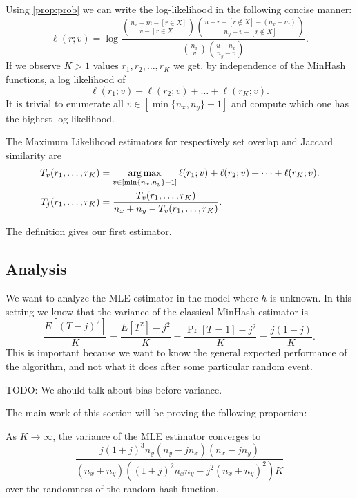 Using \cref{prop:prob} we can write the log-likelihood in the following concise manner:
\[
   \ell(r; v) = \log \frac{\binom{n_x-m-[r\in X]}{v-[r\in X]}\binom{u-r-[r\not\in X]-(n_x-m)}{n_y-v-[r\not\in X]}}{\binom{n_x}{v}\binom{u-n_x}{n_y-v}}.
   \label{eq:log-likelihood}
\]
If we observe $K>1$ values $r_1, r_2, \dots, r_K$ we get, by independence of the MinHash functions, a log likelihood of
\[
   \ell(r_1; v) + \ell(r_2; v) + \dots + \ell(r_K; v).
\]
It is trivial to enumerate all $v\in[\min\{n_x,n_y\}+1]$ and compute which one has the highest log-likelihood.
\begin{definition}
   The Maximum Likelihood estimators for respectively set overlap and Jaccard similarity are
   \begin{align}
      T_v(r_1,\dots,r_K) &= \operatorname*{arg\,max}_{v\in[\min\{n_x,n_y\}+1]} \ell(r_1; v) + \ell(r_2; v) + \dots + \ell(r_K; v).
      \\T_j(r_1,\dots,r_K) &= \frac{T_v(r_1,\dots,r_K)}{n_x+n_y - T_v(r_1,\dots,r_K)}.
   \end{align}
\end{definition}
%
The definition gives our first estimator.

\subsection{Analysis}

We want to analyze the MLE estimator in the model where $h$ is unknown.
In this setting we know that the variance of the classical MinHash estimator is
\[
   \frac{E[(T-j)^2]}{K}
      = \frac{E[T^2] - j^2}{K}
      = \frac{\Pr[T=1] - j^2}{K}
= \frac{j(1-j)}{K}.
\]
This is important because we want to know the general expected performance of the algorithm, and not what it does after some particular random event.

TODO: We should talk about bias before variance.

The main work of this section will be proving the following proportion:
\begin{proposition}\label{prop:mle_var}
   As $K\to\infty$, the variance of the MLE estimator converges to
   \[
      \frac{j (1+j)^3 n_y (n_y-j n_x) (n_x-j n_y)}{(n_x+n_y) \left((1+j)^2 n_xn_y - j^2 (n_x+n_y)^2\right)K}
   \label{eq:mle_var}
   \]
   over the randomness of the random hash function.
\end{proposition}

